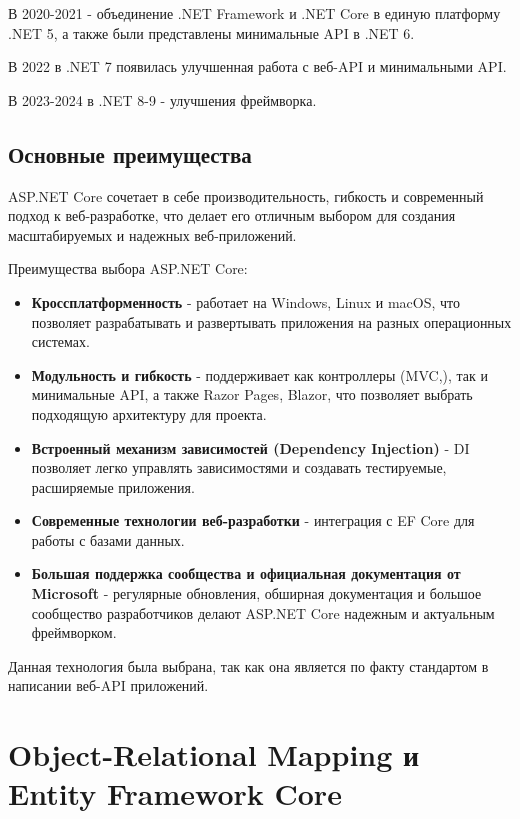 \documentclass[a4paper,12pt]{report}
\begin{document}
В 2020-2021 - объединение .NET Framework и .NET Core в единую платформу .NET 5, а также были представлены минимальные \acs{API} в .NET 6.\cite{announcing_dot_net_5_0}\cite{announcing_dot_net_6_0}

В 2022 в .NET 7 появилась улучшенная работа с веб-\acs{API} и минимальными \acs{API}.\cite{announcing_dot_net_7_0}

В 2023-2024 в .NET 8-9 - улучшения фреймворка.\cite{announcing_dot_net_8_0}\cite{announcing_dot_net_9_0}

\subsection{Основные преимущества}

ASP.NET Core сочетает в себе производительность, гибкость и современный подход к веб-разработке, что делает его отличным выбором 
для создания масштабируемых и надежных веб-приложений.

Преимущества выбора ASP.NET Core:
\begin{itemize}
    \item
        \textbf{Кроссплатформенность} - работает на Windows, Linux и macOS, что позволяет разрабатывать и развертывать приложения на разных операционных системах.
    \item 
        \textbf{Модульность и гибкость} - поддерживает как контроллеры (\acs{MVC},), так и минимальные \acs{API}, а также Razor Pages, Blazor, что позволяет выбрать 
        подходящую архитектуру для проекта.
    \item
        \textbf{Встроенный механизм зависимостей (Dependency Injection)} - \acs{DI} позволяет легко управлять зависимостями и создавать тестируемые, расширяемые приложения.
    \item
        \textbf{Современные технологии веб-разработки} - интеграция с \acs{EF} Core для работы с базами данных.
    \item
        \textbf{Большая поддержка сообщества и официальная документация от Microsoft} - регулярные обновления, обширная документация и большое сообщество 
        разработчиков делают ASP.NET Core надежным и актуальным фреймворком.
\end{itemize}

Данная технология была выбрана, так как она является по факту стандартом в написании веб-\acs{API} приложений.

\section{Object-Relational Mapping и Entity Framework Core}
\end{document}

